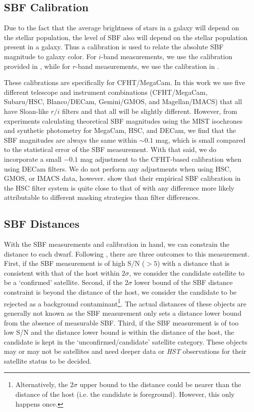 \documentclass[twocolumn]{aastex62}
\begin{document}
\subsection{SBF Calibration}
Due to the fact that the average brightness of stars in a galaxy will depend on the stellar population, the level of SBF also will depend on the stellar population present in a galaxy. Thus a calibration is used to relate the absolute SBF magnitude to galaxy color. For $i$-band measurements, we use the calibration provided in \citet{sbf_calib}, while for $r$-band measurements, we use the calibration in \citet{carlsten2020b}. 

These calibrations are specifically for CFHT/MegaCam. In this work we use five different telescope and instrument combinations (CFHT/MegaCam, Subaru/HSC, Blanco/DECam, Gemini/GMOS, and Magellan/IMACS) that all have Sloan-like $r/i$ filters and that all will be slightly different. However, from experiments calculating theoretical SBF magnitudes using the MIST isochrones and synthetic photometry \citep{mist_models} for MegaCam, HSC, and DECam, we find that the SBF magnitudes are always the same within $\sim0.1$ mag, which is small compared to the statistical error of the SBF measurement. With that said, we do incorporate a small $-0.1$ mag adjustment to the CFHT-based calibration when using DECam filters. We do not perform any adjustments when using HSC, GMOS, or IMACS data, however. \citet{kim2021} show that their empirical SBF calibration in the HSC filter system is quite close to that of \citet{sbf_calib} with any difference more likely attributable to different masking strategies than filter differences. 




\subsection{SBF Distances}
\label{sec:sbf_criteria}
With the SBF measurements and calibration in hand, we can constrain the distance to each dwarf. Following \citet{carlsten2020b}, there are three outcomes to this measurement. First, if the SBF measurement is of high S/N ($>5$) with a distance that is consistent with that of the host within $2\sigma$, we consider the candidate satellite to be a `confirmed' satellite.  Second, if the $2\sigma$ lower bound of the SBF distance constraint is beyond the distance of the host, we consider the candidate to be rejected as a background contaminant\footnote{Alternatively, the $2\sigma$ upper bound to the distance could be nearer than the distance of the host (i.e. the candidate is foreground). However, this only happens once.}. The actual distances of these objects are generally not known as the SBF measurement only sets a distance lower bound from the absence of measurable SBF. Third, if the SBF measurement is of too low S/N and the distance lower bound is within the distance of the host, the candidate is kept in the `unconfirmed/candidate' satellite category. These objects may or may not be satellites and need deeper data or \emph{HST} observations for their satellite status to be decided. 
\end{document}

